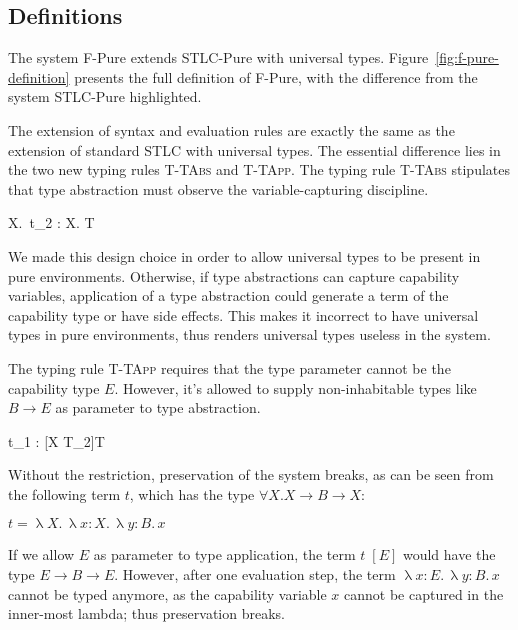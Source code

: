 \subsection{Definitions}

The system F-Pure extends STLC-Pure with universal
types. Figure~\ref{fig:f-pure-definition} presents the full definition
of F-Pure, with the difference from the system STLC-Pure highlighted.

The extension of syntax and evaluation rules are exactly the same as
the extension of standard STLC with universal types.  The essential
difference lies in the two new typing rules \textsc{T-TAbs} and
\textsc{T-TApp}. The typing rule \textsc{T-TAbs} stipulates that type
abstraction must observe the variable-capturing discipline.

{ \Gamma \vdash \uplambda X.\, t_2 : \forall X. T }

We made this design choice in order to allow universal types to be
present in pure environments. Otherwise, if type abstractions can
capture capability variables, application of a type abstraction could
generate a term of the capability type or have side effects. This
makes it incorrect to have universal types in pure environments, thus
renders universal types useless in the system.

The typing rule \textsc{T-TApp} requires that the type parameter
cannot be the capability type $E$. However, it's allowed to supply
non-inhabitable types like $B \to E$ as parameter to type abstraction.


{ \Gamma \vdash t_1 \; [T_2] : [X \mapsto T_2]T }

Without the restriction, preservation of the system breaks, as can be
seen from the following term $t$, which has the type
$\forall X. X \to B \to X$:

\begin{center}
  $t = \uplambda X. \, \uplambda x{:}X. \, \uplambda y{:}B. \, x$
\end{center}

If we allow $E$ as parameter to type application, the term $t \; [E]$
would have the type $E \to B \to E$. However, after one evaluation
step, the term $\uplambda x{:}E. \, \uplambda y{:}B. \, x$ cannot be
typed anymore, as the capability variable $x$ cannot be captured in
the inner-most lambda; thus preservation breaks.

